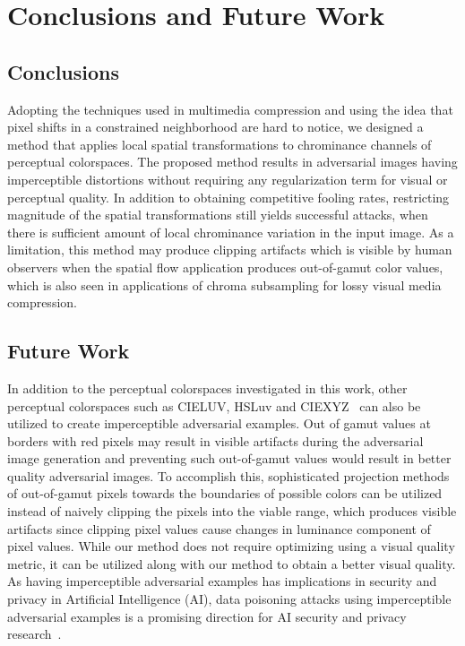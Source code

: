 \chapter{Conclusions and Future Work}
\label{chp:6_conclusion}
\section{Conclusions}
Adopting the techniques used in multimedia compression and using the idea that pixel shifts in a constrained neighborhood are hard to notice, we designed a method that applies local spatial transformations to chrominance channels of perceptual colorspaces. The proposed method results in adversarial images having imperceptible distortions without requiring any regularization term for visual or perceptual quality. In addition to obtaining competitive fooling rates, restricting magnitude of the spatial transformations still yields successful attacks, when there is sufficient amount of local chrominance variation in the input image. As a limitation, this method may produce clipping artifacts which is visible by human observers when the spatial flow application produces out-of-gamut color values, which is also seen in applications of chroma subsampling for lossy visual media compression.


\section{Future Work}
In addition to the perceptual colorspaces investigated in this work, other perceptual colorspaces such as CIELUV, HSLuv and CIEXYZ~\cite{schanda2007colorimetry} can also be utilized to create imperceptible adversarial examples. Out of gamut values at borders with red pixels may result in visible artifacts during the adversarial image generation and preventing such out-of-gamut values would result in better quality adversarial images. To accomplish this, sophisticated projection methods of out-of-gamut pixels towards the boundaries of possible colors can be utilized instead of naively clipping the pixels into the viable range, which produces visible artifacts since clipping pixel values cause changes in luminance component of pixel values. While our method does not require optimizing using a visual quality metric, it can be utilized along with our method to obtain a better visual quality.
As having imperceptible adversarial examples has implications in security and privacy in Artificial Intelligence (AI), data poisoning attacks using imperceptible adversarial examples is a promising direction for AI security and privacy research~\cite{carlini2017towards,ilyas2019adversarial}.


